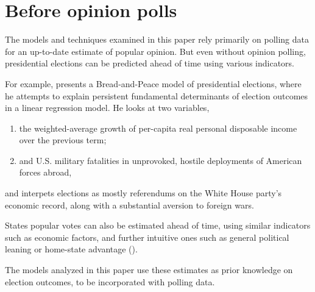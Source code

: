 \documentclass[thesis.tex]{subfiles}
\begin{document}
\section{Before opinion polls}

The models and techniques examined in this paper rely primarily on polling data for an up-to-date estimate of popular opinion. But even without opinion polling, presidential elections can be predicted ahead of time using various indicators.

For example, \cite{Hibbs:2008aa} presents a Bread-and-Peace model of presidential elections, where he attempts to explain persistent fundamental determinants of election outcomes in a linear regression model. He looks at two variables, \begin{enumerate}
	\item the weighted-average growth of per-capita real personal disposable income over the previous term;
	\item and U.S. military fatalities in unprovoked, hostile deployments of American forces abroad,
\end{enumerate} and interpets elections as mostly referendums on the White House party's economic record, along with a substantial aversion to foreign wars. 

States popular votes can also be estimated ahead of time, using similar indicators such as economic factors, and further intuitive ones such as general political leaning or home-state advantage (\citealt{Campbell:1992aa,Campbell:2006aa}).

The models analyzed in this paper use these estimates as prior knowledge on election outcomes, to be incorporated with polling data.
\end{document}
